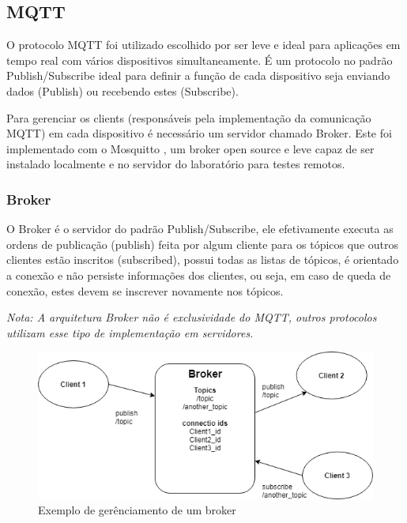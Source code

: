 \subsection{MQTT}
\label{subsection:mqtt}

O protocolo MQTT foi utilizado escolhido por ser leve e ideal para aplicações em tempo real com vários dispositivos simultaneamente. É um protocolo no padrão Publish/Subscribe  ideal para definir a função de cada dispositivo seja enviando dados (Publish) ou recebendo estes (Subscribe).

Para gerenciar os clients (responsáveis pela implementação da comunicação MQTT) em cada dispositivo é necessário um servidor chamado Broker. Este foi implementado com o Mosquitto \cite{mosquitto}, um broker open source e leve capaz de ser instalado localmente e no servidor do laboratório para testes remotos.

\subsubsection{Broker}
\label{subsubsection:broker}

O Broker é o servidor do padrão Publish/Subscribe, ele efetivamente executa as ordens de publicação (publish) feita por algum cliente para os tópicos que outros clientes estão inscritos (subscribed), possui todas as listas de tópicos, é orientado a conexão e não persiste informações dos clientes, ou seja, em caso de queda de conexão, estes devem se inscrever novamente nos tópicos.

\textit{Nota: A arquitetura Broker não é exclusividade do MQTT, outros protocolos utilizam esse tipo de implementação em servidores.}


\begin{figure}[h]
\centering
\includegraphics[width=12cm]{./02_Capitulos/02_Cap3/figures/broker_pub_sub}
\caption{Exemplo de gerênciamento de um broker}
\label{fig:3.2.0/broker_pub_sub}
\end{figure}

